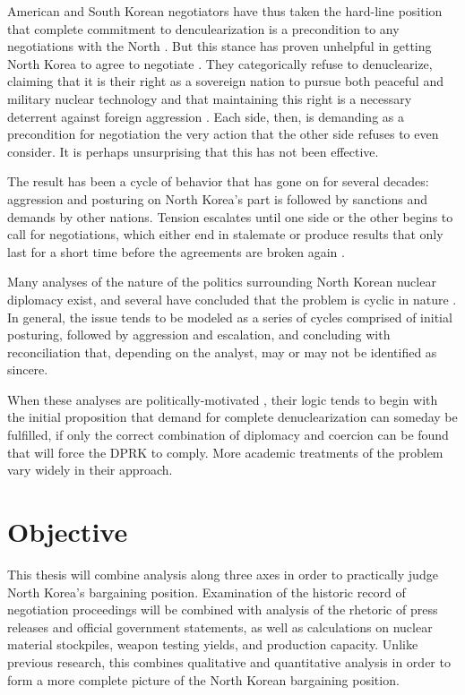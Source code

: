 \documentclass[titlepage]{article}
\begin{document}
American and South Korean negotiators have thus taken the hard-line position that complete commitment to denculearization is a precondition to any negotiations with the North \cite{lee}. But this stance has proven unhelpful in getting North Korea to agree to negotiate \cite{kcna2}. They categorically refuse to denuclearize, claiming that it is their right as a sovereign nation to pursue both peaceful and military nuclear technology and that maintaining this right is a necessary deterrent against foreign aggression \cite{kcna,kcna2}. Each side, then, is demanding as a precondition for negotiation the very action that the other side refuses to even consider. It is perhaps unsurprising that this has not been effective.

The result has been a cycle of behavior that has gone on for several decades: aggression and posturing on North Korea’s part is followed by sanctions and demands by other nations. Tension escalates until one side or the other begins to call for negotiations, which either end in stalemate or produce results that only last for a short time before the agreements are broken again \cite{bajoria, davenport}.

Many analyses of the nature of the politics surrounding North Korean nuclear diplomacy exist, and several have concluded that the problem is cyclic in nature \cite{blair, cfr, fisher, gause, jun, habib}. In general, the issue tends to be modeled as a series of cycles comprised of initial posturing, followed by aggression and escalation, and concluding with reconciliation that, depending on the analyst, may or may not be identified as sincere.

When these analyses are politically-motivated \cite{blair, cfr}, their logic tends to begin with the initial proposition that demand for complete denuclearization can someday be fulfilled, if only the correct combination of diplomacy and coercion can be found that will force the DPRK to comply. More academic treatments of the problem \cite{habib,jun} vary widely in their approach. 

\section{Objective}

This thesis will combine analysis along three axes in order to practically judge North Korea's bargaining position. Examination of the historic record of negotiation proceedings will be combined with analysis of the rhetoric of press releases and official government statements, as well as calculations on nuclear material stockpiles, weapon testing yields, and production capacity. Unlike previous research, this combines qualitative and quantitative analysis in order to form a more complete picture of the North Korean bargaining position.
\end{document}
